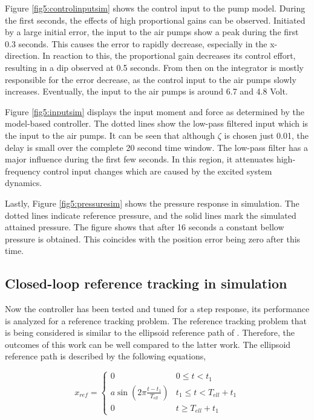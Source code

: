 Figure \ref{fig5:controlinputsim} shows the control input to the pump model. During the first seconds, the effects of high proportional gains can be observed. Initiated by a large initial error, the input to the air pumps show a peak during the first 0.3 seconds. This causes the error to rapidly decrease, especially in the x-direction. In reaction to this, the proportional gain decreases its control effort, resulting in a dip observed at 0.5 seconds. From then on the integrator is mostly responsible for the error decrease, as the control input to the air pumps slowly increases. Eventually, the input to the air pumps is around 6.7 and 4.8 Volt. 

Figure \ref{fig5:inputsim} displays the input moment and force as determined by the model-based controller. The dotted lines show the low-pass filtered input which is the input to the air pumps. It can be seen that although $\zeta$ is chosen just 0.01, the delay is small over the complete 20 second time window. The low-pass filter has a major influence during the first few seconds. In this region, it attenuates high-frequency control input changes which are caused by the excited system dynamics. 


Lastly, Figure \ref{fig5:pressuresim} shows the pressure response in simulation. The dotted lines indicate reference pressure, and the solid lines mark the simulated attained pressure. The figure shows that after 16 seconds a constant bellow pressure is obtained. This coincides with the position error being zero after this time.



\subsection*{Closed-loop reference tracking in simulation}

Now the controller has been tested and tuned for a step response, its performance is analyzed for a reference tracking problem. The reference tracking problem that is being considered is similar to the ellipsoid reference path of \cite{berkers}. Therefore, the outcomes of this work can be well compared to the latter work. The ellipsoid reference path is described by the following equations,

\begin{equation}
    x_{ref} = \begin{cases} 
      0 &  0 \leq t < t_1 \\
     a \sin(2\pi \frac{t - t_1}{T_{ell}}) &t_1 \leq t  < T_{ell} + t_1 \\
     0 & t \geq T_{ell} + t_1
   \end{cases} 
\end{equation}

